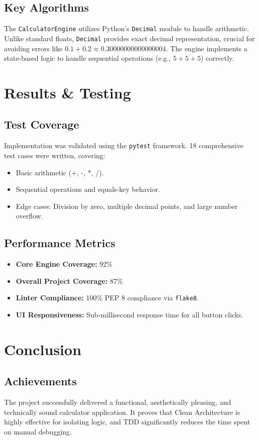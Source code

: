 \documentclass[12pt,a4paper]{article}
\begin{document}
\subsection{Key Algorithms}
The \texttt{CalculatorEngine} utilizes Python's \texttt{Decimal} module to handle arithmetic. Unlike standard floats, \texttt{Decimal} provides exact decimal representation, crucial for avoiding errors like $0.1 + 0.2 \approx 0.30000000000000004$. The engine implements a state-based logic to handle sequential operations (e.g., $5 + 5 + 5$) correctly.

\section{Results \& Testing}
\subsection{Test Coverage}
Implementation was validated using the \texttt{pytest} framework. 18 comprehensive test cases were written, covering:
\begin{itemize}
    \item Basic arithmetic (+, -, *, /).
    \item Sequential operations and equals-key behavior.
    \item Edge cases: Division by zero, multiple decimal points, and large number overflow.
\end{itemize}

\subsection{Performance Metrics}
\begin{itemize}
    \item \textbf{Core Engine Coverage:} 92\%
    \item \textbf{Overall Project Coverage:} 87\%
    \item \textbf{Linter Compliance:} 100\% PEP 8 compliance via \texttt{flake8}.
    \item \textbf{UI Responsiveness:} Sub-millisecond response time for all button clicks.
\end{itemize}

\section{Conclusion}
\subsection{Achievements}
The project successfully delivered a functional, aesthetically pleasing, and technically sound calculator application. It proves that Clean Architecture is highly effective for isolating logic, and TDD significantly reduces the time spent on manual debugging.
\end{document}
